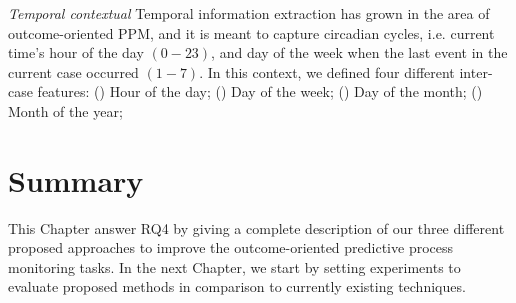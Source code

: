 \textit{Temporal contextual} Temporal information extraction has grown in the area of outcome-oriented PPM, and it is meant to capture circadian cycles, i.e. current time's hour of the day $(0-23)$, and day of the week when the last event in the current case occurred $(1-7)$. In this context, we defined four different inter-case features: () Hour of the day; () Day of the week; () Day of the month; () Month of the year; 



\section{Summary}
This Chapter answer RQ4 by giving a complete description of our three different proposed approaches to improve the outcome-oriented predictive process monitoring tasks. In the next Chapter, we start by setting experiments to evaluate proposed methods in comparison to currently existing techniques. 




